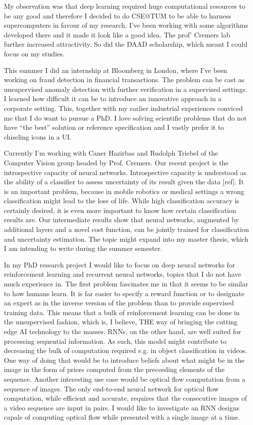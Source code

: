 My observation was that deep learning required huge computational resources to be any good and therefore I decided to do CSE@TUM to be able to harness supercomputers in favour of my research. I've been working with some algorithms developed there and it made it look like a good idea. The prof' Cremers lab further increased attractivity. So did the DAAD scholarship, which meant I could focus on my studies. 

This summer I did an internship at Bloomberg in London, where I've been working on fraud detection in financial transactions. The problem can be cast as unsupervised anomaly detection with further verification in a supervised settings. I learned how difficult it can be to introduce an innovative approach in a corporate setting. This, together with my earlier industrial experiences conviced me that I do want to pursue a PhD. I love solving scientific problems that do not have “the best” solution or reference specification and I vastly prefer it to chiseling icons in a UI. 

Currently I'm working with Caner Hazirbas and Rudolph Triebel of the Computer Vision group headed by Prof. Cremers. Our recent project is the introspective capacity of neural networks. Introspective capacity is understood as the ability of a classifier to assess uncertainty of its result given the data [ref]. It is an important problem, because in mobile robotics or medical settings a wrong classification might lead to the lose of life. While high classification accuracy is certainly desired, it is even more important to know how certain classification results are. Our intermediate results show that neural networks, augmented by additional layers and a novel cost function, can be jointly trained for classification and uncertainty estimation. The topic might expand into my master thesis, which I am intending to write during the summer semester.

In my PhD research project I would like to focus on deep neural networks for reinforcement learning and recurrent neural networks, topics that I do not have much experience in. The first problem fascinates me in that it seems to be similar to how humans learn. It is far easier to specify a reward function or to designate an expert as in the inverse version of the problem than to provide supervised training data. This means that a bulk of reinforcement learning can be done in the unsupervised fashion, which is, I believe, THE way of bringing the cutting edge AI technology to the masses. RNNs, on the other hand, are well suited for processing sequential information. As such, this model might contribute to decreasing the bulk of computation required e.g. in object classification in videos. One way of doing that would be to introduce beliefs about what might be in the image in the form of priors computed from the preceeding elements of the sequence. Another interesting use case would be optical flow computation from a sequence of images. The only end-to-end neural network for optical flow computation, while efficient and accurate, requires that the consecutive images of a video sequence are input in pairs. I would like to investigate an RNN designs capale of computing optical flow while presented with a single image at a time.

